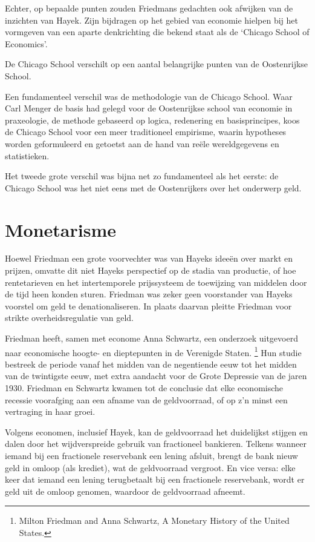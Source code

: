 \documentclass[
  a5paper,
  smalldemyvopaper,11pt,twoside,onecolumn,openright,extrafontsizes]{memoir}
\begin{document}
Echter, op bepaalde punten zouden Friedmans gedachten ook afwijken van
de inzichten van Hayek. Zijn bijdragen op het gebied van economie
hielpen bij het vormgeven van een aparte denkrichting die bekend staat
als de `Chicago School of Economics'.

De Chicago School verschilt op een aantal belangrijke punten van de
Oostenrijkse School.

Een fundamenteel verschil was de methodologie van de Chicago School.
Waar Carl Menger de basis had gelegd voor de Oostenrijkse school van
economie in praxeologie, de methode gebaseerd op logica, redenering en
basisprincipes, koos de Chicago School voor een meer traditioneel
empirisme, waarin hypotheses worden geformuleerd en getoetst aan de hand
van reële wereldgegevens en statistieken.

Het tweede grote verschil was bijna net zo fundamenteel als het eerste:
de Chicago School was het niet eens met de Oostenrijkers over het
onderwerp geld.

\section{Monetarisme}\label{monetarisme}

Hoewel Friedman een grote voorvechter was van Hayeks ideeën over markt
en prijzen, omvatte dit niet Hayeks perspectief op de stadia van
productie, of hoe rentetarieven en het intertemporele prijssysteem de
toewijzing van middelen door de tijd heen konden sturen. Friedman was
zeker geen voorstander van Hayeks voorstel om geld te denationaliseren.
In plaats daarvan pleitte Friedman voor strikte overheidsregulatie van
geld.

Friedman heeft, samen met econome Anna Schwartz, een onderzoek
uitgevoerd naar economische hoogte- en dieptepunten in de Verenigde
Staten. \footnote{Milton Friedman and Anna Schwartz, A Monetary History
  of the United States.} Hun studie bestreek de periode vanaf het midden
van de negentiende eeuw tot het midden van de twintigste eeuw, met extra
aandacht voor de Grote Depressie van de jaren 1930. Friedman en Schwartz
kwamen tot de conclusie dat elke economische recessie voorafging aan een
afname van de geldvoorraad, of op z'n minst een vertraging in haar
groei.

Volgens economen, inclusief Hayek, kan de geldvoorraad het duidelijkst
stijgen en dalen door het wijdverspreide gebruik van fractioneel
bankieren. Telkens wanneer iemand bij een fractionele reservebank een
lening afsluit, brengt de bank nieuw geld in omloop (als krediet), wat
de geldvoorraad vergroot. En vice versa: elke keer dat iemand een lening
terugbetaalt bij een fractionele reservebank, wordt er geld uit de
omloop genomen, waardoor de geldvoorraad afneemt.
\end{document}
